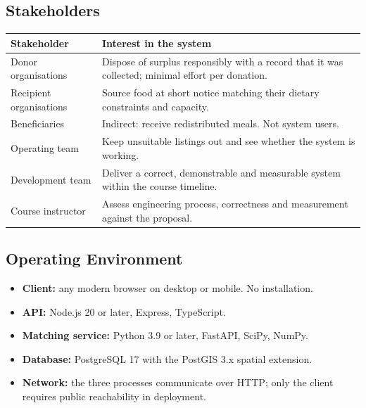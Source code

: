 \documentclass[11pt,a4paper]{article}
\begin{document}
\subsection{Stakeholders}
\begin{longtable}{@{}p{3.6cm}p{11cm}@{}}
\toprule
\textbf{Stakeholder} & \textbf{Interest in the system} \\
\midrule
\endhead
Donor organisations & Dispose of surplus responsibly with a record that it was collected; minimal effort per donation. \\
Recipient organisations & Source food at short notice matching their dietary constraints and capacity. \\
Beneficiaries & Indirect: receive redistributed meals. Not system users. \\
Operating team & Keep unsuitable listings out and see whether the system is working. \\
Development team & Deliver a correct, demonstrable and measurable system within the course timeline. \\
Course instructor & Assess engineering process, correctness and measurement against the proposal. \\
\bottomrule
\end{longtable}

\subsection{Operating Environment}
\begin{itemize}
  \item \textbf{Client:} any modern browser on desktop or mobile. No installation.
  \item \textbf{API:} Node.js 20 or later, Express, TypeScript.
  \item \textbf{Matching service:} Python 3.9 or later, FastAPI, SciPy, NumPy.
  \item \textbf{Database:} PostgreSQL 17 with the PostGIS 3.x spatial extension.
  \item \textbf{Network:} the three processes communicate over HTTP; only the
    client requires public reachability in deployment.
\end{itemize}
\end{document}
